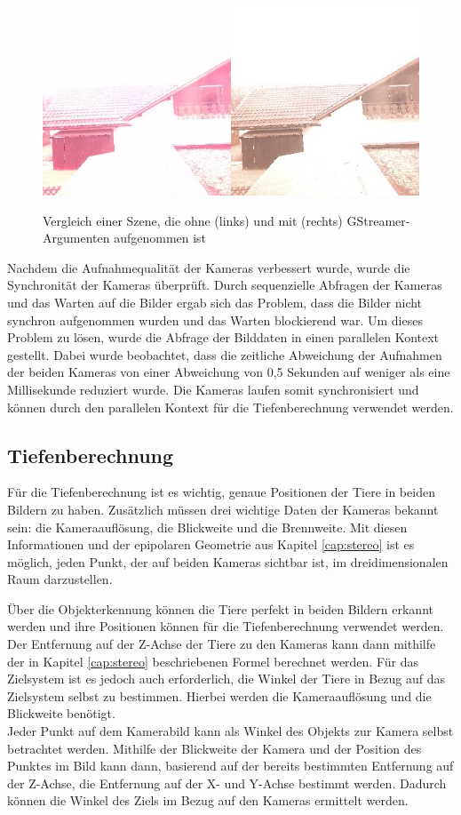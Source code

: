 \begin{figure}[H]
    \centering
    \includegraphics[width=\textwidth]{images/gstream_arg_or.png}
    \label{fig:gstreamer_argumented}
    \caption{Vergleich einer Szene, die ohne (links) und mit (rechts) GStreamer-Argumenten aufgenommen ist}
\end{figure}

Nachdem die Aufnahmequalität der Kameras verbessert wurde, wurde die Synchronität der Kameras überprüft. Durch sequenzielle Abfragen der Kameras und das Warten auf die Bilder ergab sich das Problem, dass die Bilder nicht synchron aufgenommen wurden und das Warten blockierend war. Um dieses Problem zu lösen, wurde die Abfrage der Bilddaten in einen parallelen Kontext gestellt. Dabei wurde beobachtet, dass die zeitliche Abweichung der Aufnahmen der beiden Kameras von einer Abweichung von 0,5 Sekunden auf weniger als eine Millisekunde reduziert wurde. Die Kameras laufen somit synchronisiert und können durch den parallelen Kontext für die Tiefenberechnung verwendet werden.

\subsection{Tiefenberechnung} \label{cap:calc_depth}

Für die Tiefenberechnung ist es wichtig, genaue Positionen der Tiere in beiden Bildern zu haben. Zusätzlich müssen drei wichtige Daten der Kameras bekannt sein: die Kameraauflösung, die Blickweite und die Brennweite. Mit diesen Informationen und der epipolaren Geometrie aus Kapitel \ref{cap:stereo} ist es möglich, jeden Punkt, der auf beiden Kameras sichtbar ist, im dreidimensionalen Raum darzustellen.

Über die Objekterkennung können die Tiere perfekt in beiden Bildern erkannt werden und ihre Positionen können für die Tiefenberechnung verwendet werden. Der Entfernung auf der Z-Achse der Tiere zu den Kameras kann dann mithilfe der in Kapitel \ref{cap:stereo} beschriebenen Formel berechnet werden. Für das Zielsystem ist es jedoch auch erforderlich, die Winkel der Tiere in Bezug auf das Zielsystem selbst zu bestimmen. Hierbei werden die Kameraauflösung und die Blickweite benötigt.
\\
Jeder Punkt auf dem Kamerabild kann als Winkel des Objekts zur Kamera selbst betrachtet werden. Mithilfe der Blickweite der Kamera und der Position des Punktes im Bild kann dann, basierend auf der bereits bestimmten Entfernung auf der Z-Achse, die Entfernung auf der X- und Y-Achse bestimmt werden. Dadurch können die Winkel des Ziels im Bezug auf den Kameras ermittelt werden.

